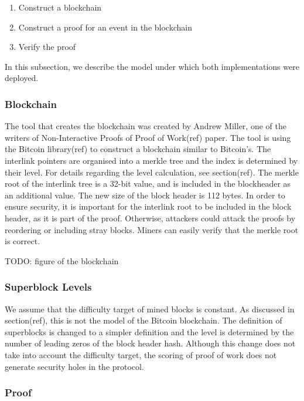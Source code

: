 \begin{enumerate}
    \item
        Construct a blockchain
    \item
        Construct a proof for an event in the blockchain
    \item
        Verify the proof
\end{enumerate}

In this subsection, we describe the model under which both
implementations were deployed.

\subsubsection{Blockchain}

The tool that creates the blockchain was created by Andrew Miller, one
of the writers of Non-Interactive Proofs of Proof of Work(ref) paper.
The tool is using the Bitcoin library(ref) to construct a blockchain
similar to Bitcoin’s. The interlink pointers are organised into a
merkle tree and the index is determined by their level. For details
regarding the level calculation, see section(ref). The merkle root of
the interlink tree is a 32-bit value, and is included in the
blockheader as an additional value. The new size of the block header
is 112 bytes. In order to ensure security, it is important for the
interlink root to be included in the block header, as it is part of
the proof. Otherwise, attackers could attack the proofs by reordering
or including stray blocks. Miners can easily verify that the merkle
root is correct.

TODO: figure of the blockchain

\subsubsection{Superblock Levels}

We assume that the difficulty target of mined blocks is constant. As
discussed in section(ref), this is not the model of the Bitcoin
blockchain. The definition of superblocks is changed to a simpler
definition and the level is determined by the number of leading zeros
of the block header hash. Although this change does not take into
account the difficulty target, the scoring of proof of work does not
generate security holes in the protocol.

\subsubsection{Proof}

